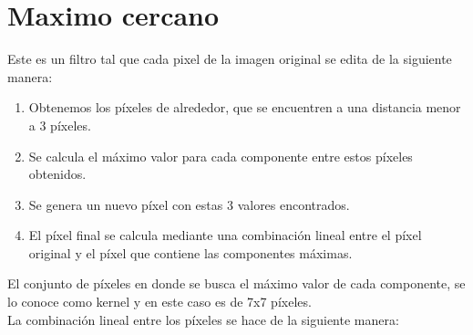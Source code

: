 \section{Maximo cercano}


Este es un filtro tal que cada pixel de la imagen original se edita de la siguiente manera:

\begin{enumerate}
	\item Obtenemos los píxeles de alrededor, que se encuentren a una distancia menor a 3 píxeles.
	\item Se calcula el máximo valor para cada componente entre estos píxeles obtenidos.
	\item Se genera un nuevo píxel con estas 3 valores encontrados.
	\item El píxel final se calcula mediante una combinación lineal entre el píxel original y el píxel que contiene las componentes máximas.
\end{enumerate}

El conjunto de píxeles en donde se busca el máximo valor de cada componente, se lo conoce como kernel y en este caso es de 7x7 píxeles.\\
La combinación lineal entre los píxeles se hace de la siguiente manera:

